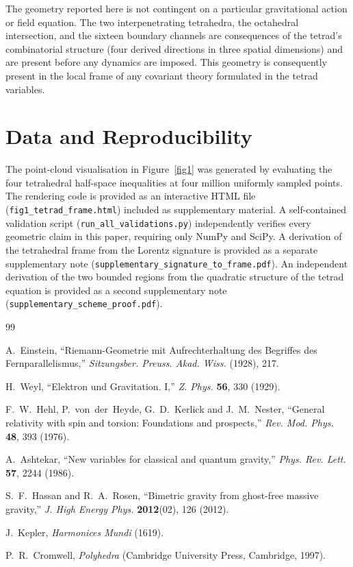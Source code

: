 \documentclass[twocolumn]{iopjournal}
\begin{document}
The geometry reported here is not contingent on a particular gravitational action or field equation. The two interpenetrating tetrahedra, the octahedral intersection, and the sixteen boundary channels are consequences of the tetrad's combinatorial structure (four derived directions in three spatial dimensions) and are present before any dynamics are imposed. This geometry is consequently present in the local frame of any covariant theory formulated in the tetrad variables.


\section*{Data and Reproducibility}

The point-cloud visualisation in Figure~\ref{fig1} was generated by
evaluating the four tetrahedral half-space inequalities at four million
uniformly sampled points. The rendering code is provided as an interactive
HTML file (\texttt{fig1\_tetrad\_frame.html}) included
as supplementary material. A self-contained validation script
(\texttt{run\_all\_validations.py}) independently verifies every geometric
claim in this paper, requiring only NumPy and SciPy. A derivation of the
tetrahedral frame from the Lorentz signature is provided as a separate
supplementary note (\texttt{supplementary\_signature\_to\_frame.pdf}).
An independent derivation of the two bounded regions from the quadratic
structure of the tetrad equation is provided as a second supplementary
note (\texttt{supplementary\_scheme\_proof.pdf}).


\begin{thebibliography}{99}

A.~Einstein,
``Riemann-Geometrie mit Aufrechterhaltung des Begriffes des Fernparallelismus,''
\textit{Sitzungsber. Preuss. Akad. Wiss.} (1928), 217.

H.~Weyl,
``Elektron und Gravitation. I,''
\textit{Z. Phys.} \textbf{56}, 330 (1929).

F.~W.~Hehl, P.~von~der~Heyde, G.~D.~Kerlick and J.~M.~Nester,
``General relativity with spin and torsion: Foundations and prospects,''
\textit{Rev. Mod. Phys.} \textbf{48}, 393 (1976).

A.~Ashtekar,
``New variables for classical and quantum gravity,''
\textit{Phys. Rev. Lett.} \textbf{57}, 2244 (1986).

S.~F.~Hassan and R.~A.~Rosen,
``Bimetric gravity from ghost-free massive gravity,''
\textit{J. High Energy Phys.} \textbf{2012}(02), 126 (2012).

J.~Kepler,
\textit{Harmonices Mundi} (1619).

P.~R.~Cromwell,
\textit{Polyhedra}
(Cambridge University Press, Cambridge, 1997).

\end{thebibliography}
\end{document}
